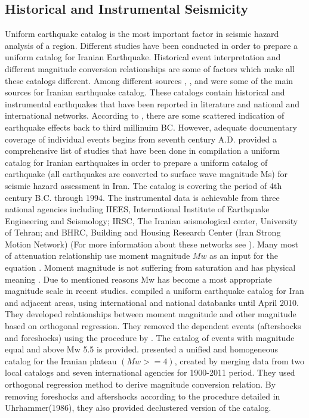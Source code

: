 \subsection{Historical  and Instrumental Seismicity}
Uniform earthquake catalog is the most important factor in seismic hazard analysis of a region.  Different studies have been conducted in order to prepare a uniform catalog for Iranian Earthquake. Historical event interpretation and different magnitude conversion relationships are some of factors which make all these catalogs different. Among different sources \citet{Ambraseys2005}, \citet{Berberian1994}, and \citet{moinfar1994} were some of the main sources for Iranian earthquake catalog. These catalogs contain historical and instrumental earthquakes that have been reported in literature and national and international networks. According to \citet{Ambraseys2005}, there are some scattered indication of earthquake effects  back to third millinuim BC. However, adequate documentary coverage of individual events begins from seventh century A.D. \citet{Mirzaei1997} provided a comprehensive list of studies that have been done in compilation a uniform catalog for Iranian earthquakes in order to prepare a uniform catalog of earthquake (all earthquakes are converted to surface wave magnitude Ms) for seismic hazard assessment in Iran. The catalog is covering the period of 4th century B.C. through 1994. The instrumental data is achievable from three national agencies including IIEES, International Institute of Earthquake Engineering and Seismology; IRSC, The Iranian seismological center, University of Tehran; and BHRC, Building and Housing Research Center (Iran Strong Motion Network) (For more information about these networks see \citet{Karimiparidari2013}).
Many most of attenuation relationship use  moment magnitude $Mw$ as an input for the equation \citep{Douglas2011}. Moment magnitude is not suffering from saturation and has physical meaning \citep{Kanamori1977}. Due to mentioned reasons Mw has become a most appropriate magnitude scale in recent studies. 
 \citet{Karimiparidari2013}compiled a uniform earthquake catalog for Iran and adjacent areas, using international and national databanks until April 2010.  They developed relationships between moment magnitude and other magnitude based on orthogonal regression.  They removed the dependent events (aftershocks and foreshocks) using the procedure by \citet{Gardner1974}. The catalog of events with magnitude equal and above Mw 5.5 is provided. 
\citet{Shahvar2013} presented a unified and homogeneous catalog for the Iranian plateau $(Mw >= 4)$, created by merging data from two local catalogs and seven international agencies for 1900-2011 period. They used orthogonal regression method \citep{Castellaro2006} to derive magnitude conversion relation. By removing foreshocks and aftershocks according to the procedure detailed in Uhrhammer(1986), they also provided declustered version of the catalog.

